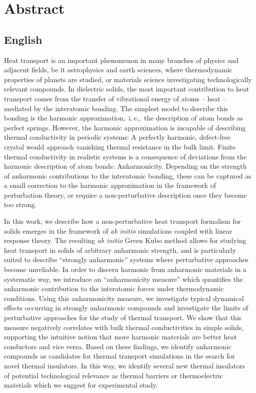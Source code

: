 \chapter{Abstract}

\section*{English}

Heat transport is an important phenomenon in many branches of physics and adjacent fields, be it astrophysics and earth sciences, where thermodynamic properties of planets are studied, or materials science investigating technologically relevant compounds. In dielectric solids, the most important contribution to heat transport comes from the transfer of vibrational energy of atoms -- heat -- mediated by the interatomic bonding. The simplest model to describe this bonding is the harmonic approximation,~i.\,e.,~the description of atom bonds as perfect springs. However, the harmonic approximation is incapable of describing thermal conductivity in periodic systems: A perfectly harmonic, defect-free crystal would approach vanishing thermal resistance in the bulk limit. Finite thermal conductivity in realistic systems is a consequence of deviations from the harmonic description of atom bonds: Anharmonicity. Depending on the strength of anharmonic contributions to the interatomic bonding, these can be captured as a small correction to the harmonic approximation in the framework of perturbation theory, or require a non-perturbative description once they become too strong.

In this work, we describe how a non-perturbative heat transport formalism for solids emerges in the framework of \emph{ab initio} simulations coupled with linear response theory. The resulting \emph{ab initio} Green Kubo method allows for studying heat transport in solids of arbitrary anharmonic strength, and is particularly suited to describe ``strongly anharmonic'' systems where perturbative approaches become unreliable. In order to discern harmonic from anharmonic materials in a systematic way, we introduce an ``anharmonicity measure'' which  quantifies the anharmonic contribution to the interatomic forces under thermodynamic conditions. Using this anharmonicity measure, we investigate typical dynamical effects occurring in strongly anharmonic compounds and investigate the limits of perturbative approaches for the study of thermal transport. We show that this measure negatively correlates with bulk thermal conductivities in simple solids, supporting the intuitive notion that more harmonic materials are better heat conductors and vice versa. Based on these findings, we identify anharmonic compounds as candidates for thermal transport simulations in the search for novel thermal insulators. In this way, we identify several new thermal insulators of potential technological relevance as thermal barriers or thermoelectric materials which we suggest for experimental study.

